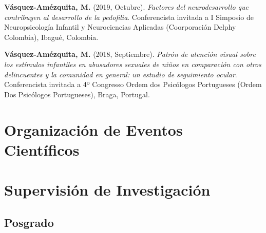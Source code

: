 \documentclass[11pt,a4paper,]{awesome-cv}
\begin{document}
\textbf{Vásquez-Amézquita, M.} (2019, Octubre). \emph{Factores del
neurodesarrollo que contribuyen al desarrollo de la pedofilia}.
Conferencista invitada a I Simposio de Neuropsicología Infantil y
Neurociencias Aplicadas (Coorporación Delphy Colombia), Ibagué,
Colombia.

\textbf{Vásquez-Amézquita, M.} (2018, Septiembre). \emph{Patrón de
atención visual sobre los estímulos infantiles en abusadores sexuales de
niños en comparación con otros delincuentes y la comunidad en general:
un estudio de seguimiento ocular}. Conferencista invitada a 4º Congresso
Ordem dos Psicólogos Portugueses (Ordem Dos Psicólogos Portugueses),
Braga, Portugal.

\endgroup

\hypertarget{organizaciuxf3n-de-eventos-cientuxedficos}{%
\section{Organización de Eventos
Científicos}\label{organizaciuxf3n-de-eventos-cientuxedficos}}

\begin{cventries}
\end{cventries}

\hypertarget{supervisiuxf3n-de-investigaciuxf3n}{%
\section{Supervisión de
Investigación}\label{supervisiuxf3n-de-investigaciuxf3n}}

\hypertarget{section-2}{%
\subsection{\texorpdfstring{\textbf{Posgrado}}{}}\label{section-2}}
\end{document}
